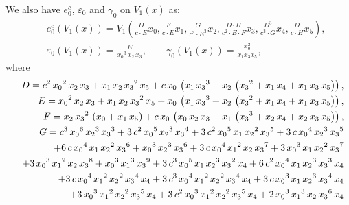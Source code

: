 \begin{thm}
We also have $e_0^c$, ${\varepsilon}_0$ and $\gamma_0$ on $V_1(x)$
as:
\begin{eqnarray*}
&&e_0^c(V_1(x))=V_1(\frac{D}{c\cdot E}x_0,\frac{F}{c\cdot E}x_1,
\frac{G}{c^3\cdot E^3}x_2,\frac{D\cdot H}{c^2\cdot E\cdot F}x_3,
\frac{D^3}{c^3\cdot G}x_4,\frac{D}{c\cdot H}x_5),\\
&&{\varepsilon}_0(V_1(x))=\frac{E}{{{x_0}}^3\,{{x_2}}\,{x_3}},{\qquad}
\gamma_0(V_1(x))=\frac{x_0^2}{x_1x_3x_5},
\end{eqnarray*}
{where}
\begin{eqnarray*}
&&\hspace{-20pt}
D=c^2\,{{x_0}}^2\,{x_2}\,{x_3} + 
 {x_1}\,{x_2}\,{{x_3}}^2\,{x_5} + 
  c\,{x_0}\,\left( {x_1}\,{{x_3}}^3 + 
 {x_2}\,\left( {{x_3}}^2 + {x_1}\,{x_4} + 
 {x_1}\,{x_3}\,{x_5} \right)  \right)
,\\
&&\hspace{-20pt}
E={{x_0}}^2\,{x_2}\,{x_3} + 
 {x_1}\,{x_2}\,{{x_3}}^2\,{x_5} + 
 {x_0}\,\left( {x_1}\,{{x_3}}^3 + 
 {x_2}\,\left( {{x_3}}^2 + {x_1}\,{x_4} + 
 {x_1}\,{x_3}\,{x_5} \right)  \right),\\
&&\hspace{-20pt}
F= {x_2}\,{{x_3}}^2\,
 \left( {x_0} + {x_1}\,{x_5} \right)  + 
 c\,{x_0}\,\left( {x_0}\,{x_2}\,{x_3} + 
 {x_1}\,\left( {{x_3}}^3 + {x_2}\,{x_4} + 
 {x_2}\,{x_3}\,{x_5} \right)  \right),\\
&&\hspace{-20pt}
G= c^3\,{{x_0}}^6\,{{x_2}}^3\,{{x_3}}^3 + 
      3\,c^2\,{{x_0}}^5\,{{x_2}}^3\,{{x_3}}^4 + 
      3\,c^2\,{{x_0}}^5\,{x_1}\,{{x_2}}^2\,{{x_3}}^5 + 
      3\,c\,{{x_0}}^4\,{{x_2}}^3\,{{x_3}}^5\\
&& + 6\,c\,{{x_0}}^4\,{x_1}\,{{x_2}}^2\,{{x_3}}^6
 +  {{x_0}}^3\,{{x_2}}^3\,{{x_3}}^6 + 
      3\,c\,{{x_0}}^4\,{{x_1}}^2\,{x_2}\,{{x_3}}^7 + 
      3\,{{x_0}}^3\,{x_1}\,{{x_2}}^2\,{{x_3}}^7 \\
&&+  3\,{{x_0}}^3\,{{x_1}}^2\,{x_2}\,{{x_3}}^8
    +  {{x_0}}^3\,{{x_1}}^3\,{{x_3}}^9 + 
3\,c^3\,{{x_0}}^5\,{x_1}\,{{x_2}}^3\,{{x_3}}^2\,{x_4}
+ 6\,c^2\,{{x_0}}^4\,{x_1}\,
  {{x_2}}^3\,{{x_3}}^3\,{x_4}\\
&& + 
3\,c\,{{x_0}}^4\,{{x_1}}^2\,{{x_2}}^2\,{{x_3}}^4\,{x_4}
+3\,c^3\,{{x_0}}^4\,{{x_1}}^2\,
{{x_2}}^2\,{{x_3}}^4\,{x_4} 
+3\,c\,{{x_0}}^3\,{x_1}\,{{x_2}}^3\,{{x_3}}^4\,{x_4}\\
&& + 
3\,{{x_0}}^3\,{{x_1}}^2\,{{x_2}}^2\,{{x_3}}^5\,{x_4}
+3\,c^2\,{{x_0}}^3\,{{x_1}}^2\,
{{x_2}}^2\,{{x_3}}^5\,{x_4}
+ 2\,{{x_0}}^3\,{{x_1}}^3\,{x_2}\,{{x_3}}^6\,{x_4}\\

\end{eqnarray*}
\end{thm}
